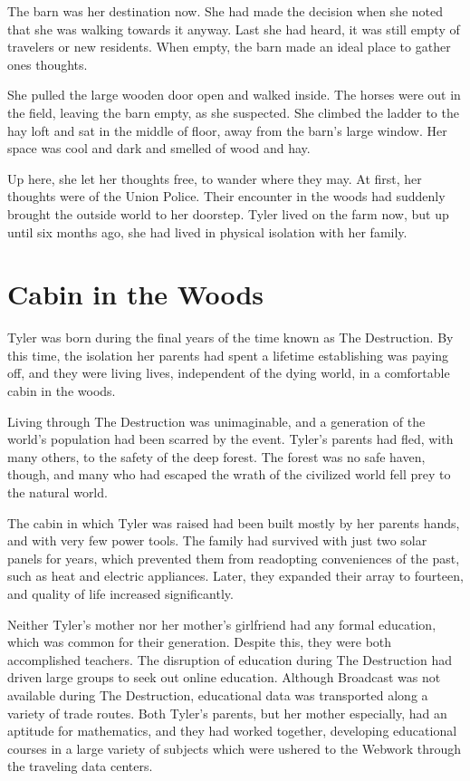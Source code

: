 \documentclass[courier]{sffms}
\begin{document}
The barn was her destination now. She
had made the decision when she noted
that she was walking towards it anyway.
Last she had heard, it was still empty of
travelers or new residents. When empty,
the barn made an ideal place to gather
ones thoughts.

She pulled the large wooden door
open and walked inside. The horses were
out in the field, leaving the barn empty, as
she suspected. She climbed the ladder to
the hay loft and sat in the middle of floor, away
from the barn's large window. Her space 
was cool and dark and smelled of wood and
hay.

Up here, she let her thoughts free, to
wander where they may. At first, her 
thoughts were of the Union Police. Their
encounter in the woods had suddenly
brought the outside world to her
doorstep.
Tyler lived on the farm now, but up until
six months ago, she had lived in physical
isolation with her family.

\chapter{Cabin in the Woods}
Tyler was born during the final years of the
time known as The Destruction. By this time,
the isolation her parents had spent a lifetime
establishing was paying off, and they were
living lives, independent of the dying world,
in a comfortable cabin in the woods.

Living through The Destruction was
unimaginable, and a generation of the
world's population had been scarred by the
event. Tyler's parents had fled, with many
others, to the safety of the deep forest.
The forest was no safe haven, though, and
many who had escaped the wrath of the
civilized world fell prey to the natural world.

The cabin in which Tyler was raised had
been built mostly by her parents hands, 
and with very few
power tools. The family had survived with
just two solar panels for years, which prevented
them from readopting conveniences of the
past, such as heat and electric appliances.
Later, they expanded their array to fourteen,
and quality of life increased significantly.

Neither Tyler's mother nor her mother's
girlfriend had any formal education, which
was common for their generation. Despite
this, they were both accomplished
teachers. The disruption of education during The
Destruction had driven large groups to seek
out online education. Although Broadcast
was not available during The Destruction,
educational data was transported along a
variety of trade routes. 
Both Tyler's parents, but her mother especially,
had an aptitude for mathematics, and they
had worked together, developing educational
courses in a large variety of subjects which
were ushered to the Webwork through the
traveling data centers.
\end{document}
